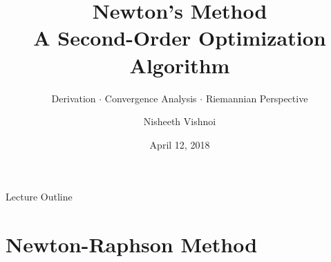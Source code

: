 \documentclass[aspectratio=169,10pt]{beamer}
\institute[CS 435]{CS 435 --- Algorithms for Convex Optimization\\
                   Yale University, 2018}
\author[Vishnoi]{Nisheeth Vishnoi}
\date{April 12, 2018}
\begin{document}
\title[Newton's Method]{\textbf{Newton's Method}\\
  \large A Second-Order Optimization Algorithm}
\subtitle{Derivation $\cdot$ Convergence Analysis $\cdot$ Riemannian Perspective}

\begin{frame}[plain]
  \titlepage
\end{frame}

\begin{frame}{Lecture Outline}
  \tableofcontents
\end{frame}

\section{Newton-Raphson Method}
\end{document}
